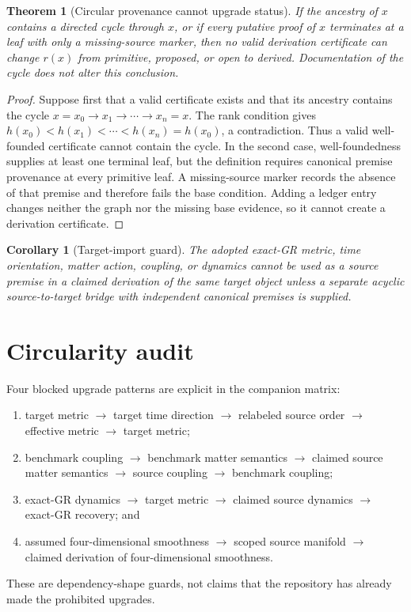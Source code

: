 \documentclass[11pt]{article}
\newtheorem{theorem}{Theorem}
\newtheorem{corollary}{Corollary}
\begin{document}
\begin{theorem}[Circular provenance cannot upgrade status]
If the ancestry of $x$ contains a directed cycle through $x$, or if every
putative proof of $x$ terminates at a leaf with only a missing-source marker,
then no valid derivation certificate can change $r(x)$ from primitive,
proposed, or open to derived.  Documentation of the cycle does not alter this
conclusion.
\end{theorem}

\begin{proof}
Suppose first that a valid certificate exists and that its ancestry contains
the cycle
\(x=x_0\to x_1\to\cdots\to x_n=x\).
The rank condition gives
\(h(x_0)<h(x_1)<\cdots<h(x_n)=h(x_0)\), a contradiction.  Thus a valid
well-founded certificate cannot contain the cycle.  In the second case,
well-foundedness supplies at least one terminal leaf, but the definition
requires canonical premise provenance at every primitive leaf.  A
missing-source marker records the absence of that premise and therefore fails
the base condition.  Adding a ledger entry changes neither the graph nor the
missing base evidence, so it cannot create a derivation certificate.
\end{proof}

\begin{corollary}[Target-import guard]
The adopted exact-GR metric, time orientation, matter action, coupling, or
dynamics cannot be used as a source premise in a claimed derivation of the
same target object unless a separate acyclic source-to-target bridge with
independent canonical premises is supplied.
\end{corollary}

\section{Circularity audit}

Four blocked upgrade patterns are explicit in the companion matrix:
\begin{enumerate}
  \item target metric $\to$ target time direction $\to$ relabeled source
  order $\to$ effective metric $\to$ target metric;
  \item benchmark coupling $\to$ benchmark matter semantics $\to$ claimed
  source matter semantics $\to$ source coupling $\to$ benchmark coupling;
  \item exact-GR dynamics $\to$ target metric $\to$ claimed source dynamics
  $\to$ exact-GR recovery; and
  \item assumed four-dimensional smoothness $\to$ scoped source manifold
  $\to$ claimed derivation of four-dimensional smoothness.
\end{enumerate}
These are dependency-shape guards, not claims that the repository has already
made the prohibited upgrades.
\end{document}
